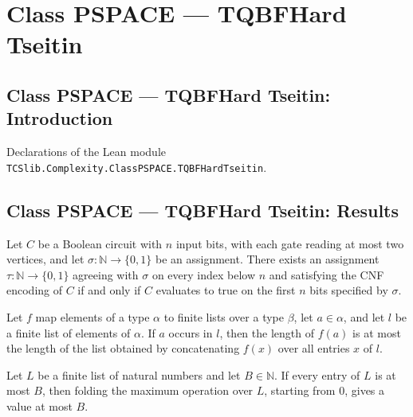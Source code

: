 \section{Class PSPACE --- TQBFHard Tseitin}
\subsection*{Class PSPACE --- TQBFHard Tseitin: Introduction}

Declarations of the Lean module \texttt{TCSlib.Complexity.ClassPSPACE.TQBFHardTseitin}.

\subsection*{Class PSPACE --- TQBFHard Tseitin: Results}

\begin{theorem}
\label{Complexity.TQBFHard.toCNF_extension_iff}
\leanok
{}
Let $C$ be a Boolean circuit with $n$ input bits, with each gate reading at most two
vertices, and let $\sigma:\mathbb{N}\to\{0,1\}$ be an assignment. There exists an
assignment $\tau:\mathbb{N}\to\{0,1\}$ agreeing with $\sigma$ on every index below $n$
and satisfying the CNF encoding of $C$ if and only if $C$ evaluates to true on the first
$n$ bits specified by $\sigma$.
\end{theorem}

\begin{theorem}
\label{Complexity.TQBFHard.length_le_length_flatMap}
\leanok
{}
Let $f$ map elements of a type $\alpha$ to finite lists over a type $\beta$, let
$a\in\alpha$, and let $l$ be a finite list of elements of $\alpha$. If $a$ occurs in
$l$, then the length of $f(a)$ is at most the length of the list obtained by
concatenating $f(x)$ over all entries $x$ of $l$.
\end{theorem}

\begin{theorem}
\label{Complexity.TQBFHard.foldr_max_le}
\leanok
{}
Let $L$ be a finite list of natural numbers and let $B\in\mathbb{N}$. If every entry of
$L$ is at most $B$, then folding the maximum operation over $L$, starting from $0$,
gives a value at most $B$.
\end{theorem}

